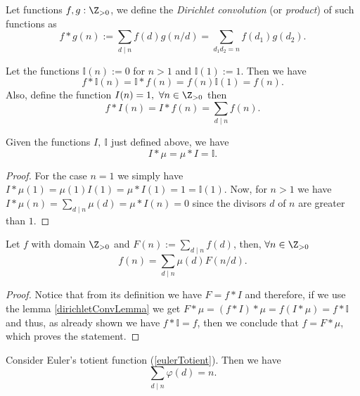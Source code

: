 \begin{definition}
    Let functions \(f, g : \Z_{>0}\), we define the \emph{Dirichlet
        convolution} (or \emph{product}) of such functions as
    \[
        f \ast g(n) := \sum_{d\mid n} f(d) g(n/d) = \sum_{d_1d_2=n} f(d_1)g(d_2).
    \]
\end{definition}

Let the functions \(\mathbb{I}(n) := 0\) for \(n > 1\) and  \(\mathbb{I}(1) :=
1\). Then we have
\[
    f \ast \mathbb{I}(n) = \mathbb{I} \ast f(n) = f(n)\mathbb{I}(1) = f(n).
\]
Also, define the function \(I(n) = 1,\ \forall  n \in \Z_{>0}\) then
\[
    f \ast I(n) = I \ast f(n) = \sum_{d \mid n} f(n).
\]

\begin{lemma}\label{dirichletConvLemma}
    Given the functions \(I,\ \mathbb{I}\) just defined above, we have
    \[
        I \ast \mu = \mu \ast I = \mathbb{I}.
    \]
\end{lemma}

\begin{proof}
    For the case \(n = 1\) we simply have  \(I \ast \mu(1) = \mu(1) I(1) = \mu
    \ast I(1) = 1 = \mathbb{I}(1)\). Now, for \(n > 1\) we have  \(I \ast \mu(n)
    = \sum_{d \mid n} \mu(d) = \mu \ast I(n) = 0\) since the divisors \(d\) of
    \(n\) are greater than \(1\).
\end{proof}

\begin{theorem}\label{mobiusInversion}
    Let \(f\) with domain  \(\Z_{>0}\) and \(F(n) := \sum_{d \mid n}
    f(d)\), then, \(\forall n \in \Z_{>0}\)
    \[
        f(n) = \sum_{d\mid n} \mu(d) F(n/d).
    \]
\end{theorem}

\begin{proof}
    Notice that from its definition we have \(F = f \ast I\) and therefore, if we
    use the lemma \ref{dirichletConvLemma} we get \(F \ast \mu = (f \ast I) \ast
    \mu = f (I \ast \mu) = f \ast \mathbb{I}\) and thus, as already shown we have
    \(f \ast \mathbb{I} = f\), then we conclude that  \(f = F \ast \mu\), which
    proves the statement.
\end{proof}

\begin{proposition}
    Consider Euler's totient function (\ref{eulerTotient}). Then we have
    \[
        \sum_{d \mid n} \varphi(d) = n.
    \]
\end{proposition}

